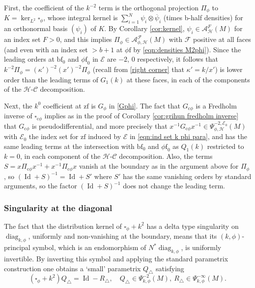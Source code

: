 \documentclass[11pt]{article}
\numberwithin{equation}{section}
\newcommand{\cphi}{{\mathrm{c}\phi}}
\theoremstyle{plain}
\theoremstyle{definition}
\newcommand\calA{{\mathcal A}}
\newcommand\calE{{\mathcal E}}
\newcommand\calF{{\mathcal F}}
\newcommand{\phif}{{\phi\mathrm{f}}}
\newcommand{\bbf}{{\mathrm{bf}}}
\newcommand{\zf}{{\mathrm{zf}}}
\DeclareMathOperator\diag{diag}
\DeclareMathOperator{\Id}{Id}
\begin{document}
First,
the coefficient of the $k^{-2}$ term is the orthogonal projection $\Pi_\phi$ to $K=\ker_{L^2}\square_\phi$, whose integral kernel is $\sum_{i=1}^N \psi_i \otimes\overline\psi_i$ (times b-half densities) for an orthonormal basis $(\psi_i)$ of $K$. By Corollary \ref{cor:kernel}, $\psi_i\in \calA^F_{\mathscr{H}}(M)$ for an index set $F>0$, and this implies
$\Pi_\phi\in\calA^\calF_{\phi,\mathscr{H}}(M)$ with $\calF$ positive at all faces (and even with an index set $>b+1$ at $\phif$ by \eqref{eqn:densities M2phi}). Since the leading orders at $\bbf_0$ and $\phif_0$ in $\calE$ are $-2$, $0$ respectively, it follows that $k^{-2}\Pi_\phi=(\kappa')^{-2}(x')^{-2}\Pi_\phi$ (recall from \eqref{right corner} that $\kappa'= k/x'$) is lower order than the leading terms of $G_1(k)$ at these faces, in each of the components of the $\mathscr{H}$-$\mathscr{C}$ decomposition.

Next, the $k^0$ coefficient at $\zf$ is $G_\phi$ in \eqref{Gphi}. The fact that $G_{\cphi}$ is a Fredholm inverse of $\square_{\cphi}$ implies as in the proof of Corollary \ref{cor:grihun fredholm inverse} that $G_{\cphi}$ is pseudodifferential, and more precisely that $x^{-1}G_{\cphi}x^{-1}\in \Psi^{-2,\calE_0}_{\phi, \mathscr{H}}(M)$ with $\calE_0$ the index set for $\zf$ induced by $\calE$ in \eqref{eqn:ind set k phi para}, and has the same leading terms at the intersection with $\bbf_0$ and $\phif_0$ as $Q_1(k)$ restricted to $k=0$, in each component of the $\mathscr{H}$-$\mathscr{C}$ decomposition.
Also, the terms $S=x \Pi_{\cphi} x^{-1} + x^{-1} \Pi_{\cphi} x$ vanish at the boundary as in the argument above for $\Pi_\phi$, so $(\Id+S)^{-1}=\Id+S'$ where $S'$ has the same vanishing orders by standard arguments, so the factor $(\Id+S)^{-1}$ does not change the leading term.

\subsubsection{Singularity at the diagonal}
The fact that the distribution kernel of $\square_\phi+k^2$ has a delta type singularity on $\diag_{k,\phi}$, uniformly and non-vanishing at the boundary, means that its $(k,\phi)$-principal symbol, which is an endomorphism of $N^*\diag_{k,\phi}$, is uniformly invertible. By inverting this symbol and applying the standard parametrix construction one obtains a `small' parametrix $Q_\triangle$ satisfying
\[
(\square_\phi+k^2)Q_\triangle = \Id - R_\triangle,\quad
Q_{\triangle}\in \Psi_{k,\phi}^{-2}(M),\
R_{\triangle}\in \Psi_{k,\phi}^{-\infty}(M).
\]
\end{document}
